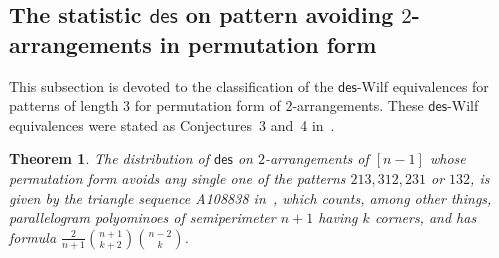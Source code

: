 \documentclass[12pt]{amsart}
\numberwithin{equation}{section}
\theoremstyle{plain}
\newtheorem{theorem}{Theorem}[section]
\theoremstyle{definition}
\def\des{\mathsf{des}}
\begin{document}
\subsection{The statistic \texorpdfstring{$\des$ on pattern avoiding $2$-arrangements}{des on pattern avoiding 2-arrangements} in permutation form}

This subsection is devoted to the classification of the $\des$-Wilf equivalences  for patterns of length $3$ for permutation form of  $2$-arrangements. These $\des$-Wilf equivalences were stated as Conjectures~3 and~4 in~\cite[Sec.~3.6]{bs}.


\begin{theorem}
The distribution of $\des$ on $2$-arrangements of $[n-1]$ whose permutation form avoids any single one of the patterns $213,312,231$ or $132$, is given by the triangle sequence A108838 in~\cite{oeis}, which counts, among other things, parallelogram polyominoes of semiperimeter $n+1$ having $k$ corners, and has formula $\frac{2}{n+1}\binom{n+1}{k+2}\binom{n-2}{k}$. 
\end{theorem}
\end{document}
